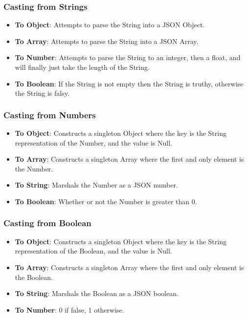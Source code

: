 \subsubsection{Casting from Strings}

\begin{itemize}
    \item \textbf{To Object}: Attempts to parse the String into a JSON Object.
    \item \textbf{To Array}: Attempts to parse the String into a JSON Array.
    \item \textbf{To Number}: Attempts to parse the String to an integer, then a float, and will finally just take the length of the String.
    \item \textbf{To Boolean}: If the String is not empty then the String is truthy, otherwise the String is falsy.
\end{itemize}

\subsubsection{Casting from Numbers}

\begin{itemize}
    \item \textbf{To Object}: Constructs a singleton Object where the key is the String representation of the Number, and the value is Null.
    \item \textbf{To Array}: Constructs a singleton Array where the first and only element is the Number.
    \item \textbf{To String}: Marshals the Number as a JSON number.
    \item \textbf{To Boolean}: Whether or not the Number is greater than 0.
\end{itemize}

\subsubsection{Casting from Boolean}

\begin{itemize}
    \item \textbf{To Object}: Constructs a singleton Object where the key is the String representation of the Boolean, and the value is Null.
    \item \textbf{To Array}: Constructs a singleton Array where the first and only element is the Boolean.
    \item \textbf{To String}: Marshals the Boolean as a JSON boolean.
    \item \textbf{To Number}: 0 if false, 1 otherwise.
\end{itemize}

